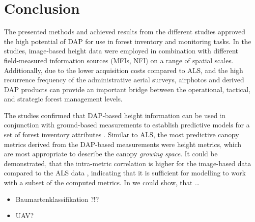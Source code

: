 \chapter{Conclusion}
\label{chp:Conclusion}


The presented methods and achieved results from the different studies approved the high potential
of \ac{DAP} for use in forest inventory and monitoring tasks.
In the studies, image-based height data were employed in combination with different field-measured information sources
(\aclp{MFI}, \acl{NFI}) on a range of spatial scales.
Additionally, due to the lower acquisition costs compared to \ac{ALS}, and the high recurrence frequency of the 
administrative aerial surveys, airphotos and derived \ac{DAP} products
can provide an important bridge between the operational, tactical, and strategic forest management levels. 

The studies confirmed that \ac{DAP}-based height information can be used in conjunction with ground-based measurements 
to establish predictive models for a set of forest inventory attributes \parencites[see][]{Stepper.2015b, White.2015, Straub.2016, Stepper.2016}.
Similar to \ac{ALS}, the most predictive canopy metrics derived from the \ac{DAP}-based measurements were height metrics, 
which are most appropriate to describe the canopy \emph{growing space}. 
It could be demonstrated, that the intra-metric correlation is higher for the image-based data compared to the \ac{ALS} data \parencite[see][]{White.2015},
indicating that it is sufficient for modelling to work with a subset of the computed metrics. 
In \textcite{Stepper.2015b} we could show, that \dots



\begin{itemize}
	\item Baumartenklassifikation ?!?
	\item UAV?
\end{itemize}